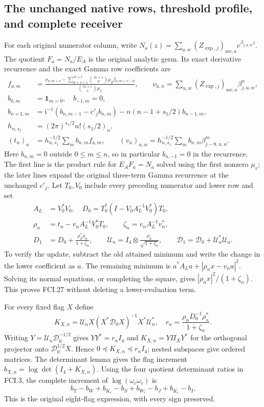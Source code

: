 \subsection{The unchanged native rows, threshold profile, and complete receiver}

For each original numerator column, write
$N_a(z)=\sum_{u,w}(Z_{\exp,j})_{uw,a}e^{\beta_{j,u,w}z}$.
The quotient $F_a=N_a/E_A$ is the original analytic germ.  Its exact
derivative recurrence and the exact Gamma row coefficients are
\[
 \begin{split}
 f_{a,m}&=\frac{\nu_{a,m+v}-\sum_{d=v+1}^{m+v}
        \binom{m+v}{d}\mu_df_{a,m+v-d}}
                  {\binom{m+v}{v}\mu_v},\qquad
 \nu_{a,n}=\sum_{u,w}(Z_{\exp,j})_{uw,a}\beta_{j,u,w}^{n},\\
 b_{0,m}&=\mathbf1_{m=0},\quad b_{-1,m}=0,\\
 b_{n+1,m}&=\mathrm i^{-1}(b_{n,m-1}-c'_jb_{n,m})
                       -n(n-1+s_1/2)b_{n-1,m},\\
 h_{n,s_1}&=(2\pi)^{s_1/2}n!(s_1/2)_n,\\
 (t_n)_a&=h_{n,s_1}^{-1/2}\sum_m b_{n,m}f_{a,m},\qquad
 (v_n)_{u,w}=h_{n,s_1}^{-1/2}\sum_m b_{n,m}\beta_{j-8,u,w}^{m}.
 \end{split}\tag{FCI.26}
\]
Here $b_{n,m}=0$ outside $0\leq m\leq n$, so in particular
$b_{n,-1}=0$ in the recurrence.  The first line is the product rule for $E_AF_a=N_a$ solved using
the first nonzero $\mu_v$; the later lines expand the original
three-term Gamma recurrence at the unchanged $c'_j$.
Let $T_0,V_0$ include every preceding numerator and lower row and set
\[
 \begin{split}
 A_L&=V_0^*V_0,\quad
 D_0=T_0^*(I-V_0A_L^{-1}V_0^*)T_0,\\
 \rho_n&=t_n-v_nA_L^{-1}V_0^*T_0,\qquad
 \zeta_n=v_nA_L^{-1}v_n^*,\\
 D_1&=D_0+\frac{\rho_n^*\rho_n}{1+\zeta_n},\qquad
 \mathcal U_n=I_4\otimes\frac{\rho_n}{\sqrt{1+\zeta_n}},\qquad
 \mathcal D_1=\mathcal D_0+\mathcal U_n^*\mathcal U_n.
 \end{split}\tag{FCI.27}
\]
To verify the update, subtract the old attained minimum and write the
change in the lower coefficient as $a$.  The remaining minimum is
$a^*A_La+|\rho_nx-v_na|^2$.  Solving its normal equations, or
completing the square, gives $|\rho_nx|^2/(1+\zeta_n)$.
This proves FCI.27 without deleting a lower-evaluation term.

For every fixed flag $X$ define
\[
 K_{X,n}=\mathcal U_nX(X^*\mathcal D_0X)^{-1}X^*\mathcal U_n^*,\quad
 r_n=\frac{\rho_nD_0^{-1}\rho_n^*}{1+\zeta_n}.
 \tag{FCI.28}
\]
Writing $Y=\mathcal U_n\mathcal D_0^{-1/2}$ gives $YY^*=r_nI_4$
and $K_{X,n}=Y\Pi_XY^*$ for the orthogonal projector onto
$\mathcal D_0^{1/2}X$.  Hence $0\preceq K_{X,n}\preceq r_nI_4$;
nested subspaces give ordered matrices.  The determinant lemma gives
the flag increment $b_{X,n}=\log\det(I_4+K_{X,n})$.
Using the four quotient determinant ratios in FCI.3, the complete
increment of $\log(\omega_c\omega_i)$ is
\[
 b_T-b_W+b_{K_c}-b_S+b_{W_i}-b_J+b_{K_i}-b_I.
 \tag{FCI.29}
\]
This is the original eight-flag expression, with every sign preserved.

